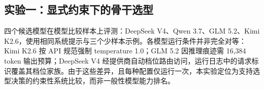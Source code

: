 \documentclass[11pt]{article}
\begin{document}
\subsection{{\cjkfont 实\allowbreak 验\allowbreak 一\allowbreak ：\allowbreak 显\allowbreak 式\allowbreak 约\allowbreak 束\allowbreak 下\allowbreak 的\allowbreak 骨\allowbreak 干\allowbreak 选\allowbreak 型}}
{\cjkfont 四\allowbreak 个\allowbreak 候\allowbreak 选\allowbreak 模\allowbreak 型\allowbreak 在\allowbreak 模\allowbreak 型\allowbreak 比\allowbreak 较\allowbreak 样\allowbreak 本\allowbreak 上\allowbreak 评\allowbreak 测\allowbreak ：}DeepSeek V4{\cjkfont 、}Qwen 3.7{\cjkfont 、}GLM 5.2{\cjkfont 、}Kimi K2.6{\cjkfont ，\allowbreak 使\allowbreak 用\allowbreak 相\allowbreak 同\allowbreak 系\allowbreak 统\allowbreak 提\allowbreak 示\allowbreak 与\allowbreak 三\allowbreak 个\allowbreak 少\allowbreak 样\allowbreak 本\allowbreak 示\allowbreak 例\allowbreak 。\allowbreak 各\allowbreak 模\allowbreak 型\allowbreak 运\allowbreak 行\allowbreak 条\allowbreak 件\allowbreak 并\allowbreak 非\allowbreak 完\allowbreak 全\allowbreak 对\allowbreak 等\allowbreak ：}Kimi K2.6 {\cjkfont 按} API {\cjkfont 规\allowbreak 范\allowbreak 强\allowbreak 制} temperature 1.0{\cjkfont ；}GLM 5.2 {\cjkfont 因\allowbreak 推\allowbreak 理\allowbreak 痕\allowbreak 迹\allowbreak 需} 16,384 token {\cjkfont 输\allowbreak 出\allowbreak 预\allowbreak 算\allowbreak ；}DeepSeek V4 {\cjkfont 经\allowbreak 提\allowbreak 供\allowbreak 商\allowbreak 自\allowbreak 动\allowbreak 档\allowbreak 位\allowbreak 路\allowbreak 由\allowbreak 访\allowbreak 问\allowbreak ，\allowbreak 运\allowbreak 行\allowbreak 日\allowbreak 志\allowbreak 中\allowbreak 的\allowbreak 请\allowbreak 求\allowbreak 标\allowbreak 识\allowbreak 覆\allowbreak 盖\allowbreak 其\allowbreak 档\allowbreak 位\allowbreak 家\allowbreak 族\allowbreak 。\allowbreak 由\allowbreak 于\allowbreak 这\allowbreak 些\allowbreak 差\allowbreak 异\allowbreak ，\allowbreak 且\allowbreak 每\allowbreak 种\allowbreak 配\allowbreak 置\allowbreak 仅\allowbreak 运\allowbreak 行\allowbreak 一\allowbreak 次\allowbreak ，\allowbreak 本\allowbreak 实\allowbreak 验\allowbreak 定\allowbreak 位\allowbreak 为\allowbreak 支\allowbreak 持\allowbreak 选\allowbreak 型\allowbreak 决\allowbreak 策\allowbreak 的\allowbreak 约\allowbreak 束\allowbreak 性\allowbreak 系\allowbreak 统\allowbreak 比\allowbreak 较\allowbreak ，\allowbreak 而\allowbreak 非\allowbreak 一\allowbreak 般\allowbreak 性\allowbreak 模\allowbreak 型\allowbreak 能\allowbreak 力\allowbreak 排\allowbreak 名\allowbreak 。}
\end{document}
